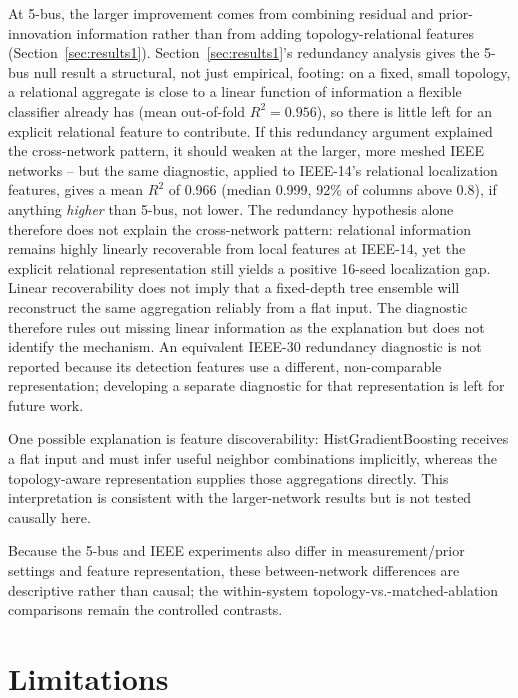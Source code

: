 \documentclass[conference]{IEEEtran}
\begin{document}
At 5-bus, the larger improvement comes from combining residual and prior-innovation information rather than from adding topology-relational features (Section~\ref{sec:results1}). Section~\ref{sec:results1}'s redundancy analysis gives the 5-bus null result a structural, not just empirical, footing: on a fixed, small topology, a relational aggregate is close to a linear function of information a flexible classifier already has (mean out-of-fold $R^2 = 0.956$), so there is little left for an explicit relational feature to contribute. If this redundancy argument explained the cross-network pattern, it should weaken at the larger, more meshed IEEE networks -- but the same diagnostic, applied to IEEE-14's relational localization features, gives a mean $R^2$ of 0.966 (median 0.999, 92\% of columns above 0.8), if anything \emph{higher} than 5-bus, not lower. The redundancy hypothesis alone therefore does not explain the cross-network pattern: relational information remains highly linearly recoverable from local features at IEEE-14, yet the explicit relational representation still yields a positive 16-seed localization gap. Linear recoverability does not imply that a fixed-depth tree ensemble will reconstruct the same aggregation reliably from a flat input. The diagnostic therefore rules out missing linear information as the explanation but does not identify the mechanism. An equivalent IEEE-30 redundancy diagnostic is not reported because its detection features use a different, non-comparable representation; developing a separate diagnostic for that representation is left for future work.

One possible explanation is feature discoverability: HistGradientBoosting receives a flat input and must infer useful neighbor combinations implicitly, whereas the topology-aware representation supplies those aggregations directly. This interpretation is consistent with the larger-network results but is not tested causally here.

Because the 5-bus and IEEE experiments also differ in measurement/prior settings and feature representation, these between-network differences are descriptive rather than causal; the within-system topology-vs.-matched-ablation comparisons remain the controlled contrasts.

\section{Limitations}
\end{document}
